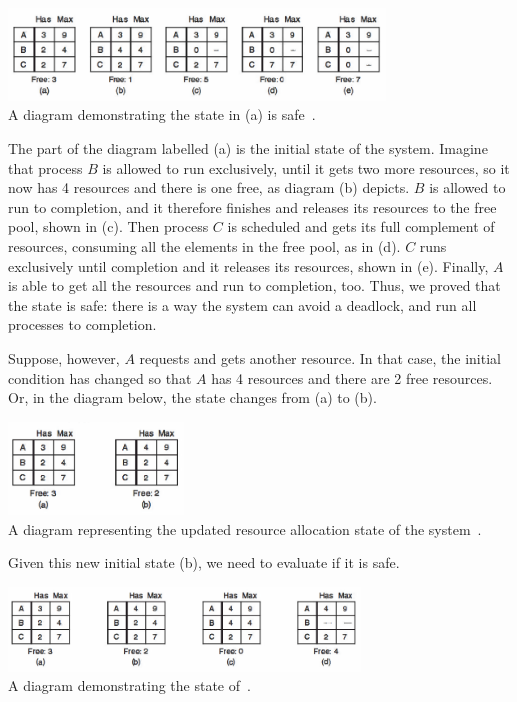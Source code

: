 \begin{center}
\includegraphics[width=0.75\textwidth]{images/safe-state.png}\\
A diagram demonstrating the state in (a) is safe~\cite{mos}.
\end{center}

The part of the diagram labelled (a) is the initial state of the system. Imagine that process $B$ is allowed to run exclusively, until it gets two more resources, so it now has 4 resources and there is one free, as diagram (b) depicts. $B$ is allowed to run to completion, and it therefore finishes and releases its resources to the free pool, shown in (c). Then process $C$ is scheduled and gets its full complement of resources, consuming all the elements in the free pool, as in (d). $C$ runs exclusively until completion and it releases its resources, shown in (e). Finally, $A$ is able to get all the resources and run to completion, too. Thus, we proved that the state is safe: there is a way the system can avoid a deadlock, and run all processes to completion.

Suppose, however, $A$ requests and gets another resource. In that case, the initial condition has changed so that $A$ has 4 resources and there are 2 free resources. Or, in the diagram below, the state changes from (a) to (b).

\begin{center}
\includegraphics[width=0.35\textwidth]{images/unsafe-state-initial.png}\\
A diagram representing the updated resource allocation state of the system~\cite{mos}.
\end{center}

Given this new initial state (b), we need to evaluate if it is safe. 

\begin{center}
\includegraphics[width=0.70\textwidth]{images/unsafe-state.png}\\
A diagram demonstrating the state of~\cite{mos}.
\end{center}

